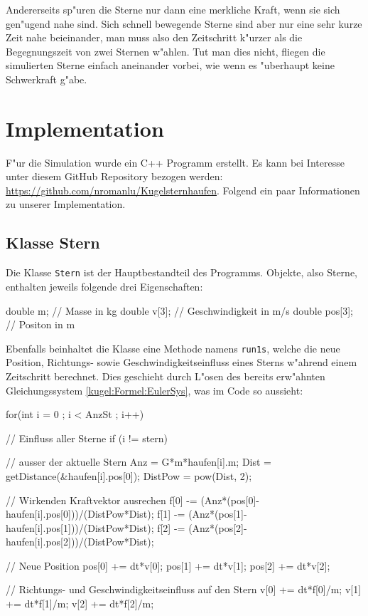 \begin{refsection}
Andererseits sp"uren die Sterne nur dann eine merkliche Kraft, wenn sie
sich gen"ugend nahe sind. Sich schnell bewegende Sterne sind aber nur eine
sehr kurze Zeit nahe beieinander, man muss also den Zeitschritt k"urzer
als die Begegnungszeit von zwei Sternen w"ahlen. Tut man dies nicht,
fliegen die simulierten Sterne einfach aneinander vorbei, wie wenn es
"uberhaupt keine Schwerkraft g"abe.
     
\section{Implementation}
F"ur die Simulation wurde ein C++ Programm erstellt. Es kann
bei Interesse unter diesem GitHub Repository bezogen werden:
\url{https://github.com/nromanlu/Kugelsternhaufen}.
Folgend ein paar Informationen zu unserer Implementation.

\subsection{Klasse Stern}
Die Klasse \texttt{Stern} ist der Hauptbestandteil des Programms. Objekte, also Sterne, enthalten jeweils folgende drei Eigenschaften:
\begin{Cpp}
double m;			// Masse in kg
double v[3];		// Geschwindigkeit in m/s
double pos[3];		// Positon in m 
\end{Cpp}
Ebenfalls beinhaltet die Klasse eine Methode namens \texttt{run1s},
welche die neue Position, Richtungs- sowie Geschwindigkeitseinfluss eines
Sterns w"ahrend einem Zeitschritt berechnet. Dies geschieht durch L"osen
des bereits erw"ahnten Gleichungssystem \ref{kugel:Formel:EulerSys},
was im Code so aussieht:
\begin{Cpp}
for(int i = 0 ; i < AnzSt ; i++){	// Einfluss aller Sterne
	if (i != stern) {				// ausser der aktuelle Stern
		Anz = G*m*haufen[i].m;
		Dist = getDistance(&haufen[i].pos[0]);
		DistPow = pow(Dist, 2);

		// Wirkenden Kraftvektor ausrechen
		f[0] -= (Anz*(pos[0]-haufen[i].pos[0]))/(DistPow*Dist);
		f[1] -= (Anz*(pos[1]-haufen[i].pos[1]))/(DistPow*Dist);
		f[2] -= (Anz*(pos[2]-haufen[i].pos[2]))/(DistPow*Dist);
	}
}
// Neue Position
pos[0] += dt*v[0];
pos[1] += dt*v[1];
pos[2] += dt*v[2];

// Richtungs- und Geschwindigkeitseinfluss auf den Stern
v[0] += dt*f[0]/m;
v[1] += dt*f[1]/m;
v[2] += dt*f[2]/m;
\end{Cpp}
	

\end{refsection}
